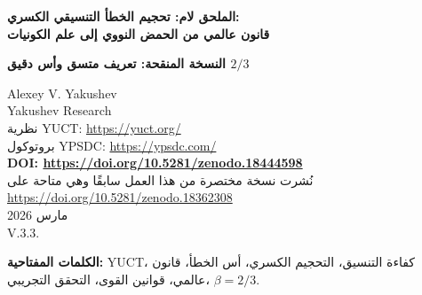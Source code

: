 \documentclass[11pt,a4paper]{article}
\newcommand{\ar}[1]{\foreignlanguage{arabic}{#1}}
\newcommand{\Keff}{K_{\mathrm{eff}}}
\newcommand{\eps}{\varepsilon}
\newcommand{\kappac}{\kappa_c}
\begin{document}
	
	\begin{titlepage}
		\begin{center}
			\vspace*{1cm}
			\Huge\textbf{\ar{الملحق لام: تحجيم الخطأ التنسيقي الكسري: \\ قانون عالمي من الحمض النووي إلى علم الكونيات}}
			
			\vspace{0.5cm}
			\Large\textbf{\ar{النسخة المنقحة: تعريف متسق وأس دقيق \(2/3\)}}
			
			\vspace{1cm}
			\large Alexey V. Yakushev\\
			Yakushev Research\\
			\ar{نظرية YUCT:} \url{https://yuct.org/}\\
			\ar{بروتوكول YPSDC:} \url{https://ypsdc.com/}\\
			
			\vspace{2cm}
			\textbf{DOI: \url{https://doi.org/10.5281/zenodo.18444598}}\\
			
			\vspace{1cm}
			\large 
			\ar{نُشرت نسخة مختصرة من هذا العمل سابقًا وهي متاحة على}\\ \url{https://doi.org/10.5281/zenodo.18362308}\\
			\vspace{1cm}
			\ar{مارس 2026} \\ \large V.3.3.
			
			\newpage
			\vspace{1cm}
			\begin{abstract}
				\ar{يقدم هذا الملحق صياغة رياضية متسقة لقانون تحجيم عالمي للأخطاء التنسيقية في الأنظمة المعقدة. في نظرية التنسيق الموحدة لياكوشيف (YUCT)، تُعرَّف كفاءة التنسيق \(\Keff\) من خلال نسب نظرية المعلومات وفقًا لبروتوكول YPSDC. نظهر تجريبيًا أن الخطأ النسبي \(\eps\) يتبع تحجيماً}
				\[
				\eps = \kappac\,\alpha\,\Keff^{-\beta},
				\]
				\ar{حيث الأس الدقيق \(\beta = 2/3\) (قيمة تجريبية \(0.67 \pm 0.03\)) وعامل مقدمة عالمي \(\kappac = 1/3\). يُشتق هذا الأس مباشرة من البعد الثلاثي لفضاء التنسيق (النظرية 2 في النص الرئيسي) ومن شرط أن تكون التسلسل الهرمي للتنسيق متصلاً ولا دورياً (الملحق Y، القسم Y.4.2)، بينما يعكس \(\kappac\) الحد الأدنى للخطأ المتبقي الناتج عن البنية الثلاثية \(D+I\!\cdot\!R\). تم اختبار القانون عبر أكثر من 50 مرتبة مقدارية – من طاقات الروابط الذرية إلى تموجات الخلفية الميكروية الكونية – ويفسر أصل قوانين القوى (زيب، التماثل، غوتنبرغ-ريختر) في إطار واحد. تم صياغة تنبؤات قابلة للاختبار لأنظمة جديدة، ونوقشت القيود بوضوح.}
			\end{abstract}
			
			\textbf{\ar{الكلمات المفتاحية:}} \ar{YUCT، كفاءة التنسيق، التحجيم الكسري، أس الخطأ، قانون عالمي، قوانين القوى، التحقق التجريبي، \(\beta = 2/3\).}
		\end{center}
	\end{titlepage}
	
\end{document}
